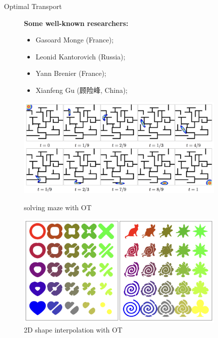 \begin{frame}{Optimal Transport}
\begin{figure}
\begin{minipage}[t]{0.6\linewidth}
            \textbf{Some well-known researchers:}
            \begin{itemize}
                \item Gasoard Monge (France);
                \item Leonid Kantorovich (Russia);
                \item Yann Brenier (France);
                \item Xianfeng Gu (顾险峰, China);
            \end{itemize}
        \end{minipage}
        \captionsetup{font=tiny}
        \begin{minipage}[t]{0.38\linewidth}
            \vspace{0pt}
            \centering
            \includegraphics[width=0.9\textwidth]{png/maze.png}
            \caption{solving maze with OT}
            \includegraphics[width=0.9\textwidth]{png/2DShapeInterpolation.png}
            \caption{2D shape interpolation with OT}
        \end{minipage}
    \end{figure}


\end{frame}
